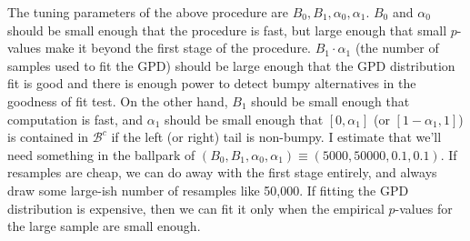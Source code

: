 \documentclass[12pt]{article}
\begin{document}
The tuning parameters of the above procedure are $B_0, B_1, \alpha_0, \alpha_1$. $B_0$ and $\alpha_0$ should be small enough that the procedure is fast, but large enough that small $p$-values make it beyond the first stage of the procedure. $B_1 \cdot \alpha_1$ (the number of samples used to fit the GPD) should be large enough that the GPD distribution fit is good and there is enough power to detect bumpy alternatives in the goodness of fit test. On the other hand, $B_1$ should be small enough that computation is fast, and $\alpha_1$ should be small enough that $[0,\alpha_1]$ (or $[1-\alpha_1, 1]$) is contained in $\mathcal B^c$ if the left (or right) tail is non-bumpy. I estimate that we'll need something in the ballpark of $(B_0, B_1, \alpha_0, \alpha_1) \equiv (5000, 50000, 0.1, 0.1)$. If resamples are cheap, we can do away with the first stage entirely, and always draw some large-ish number of resamples like 50,000. If fitting the GPD distribution is expensive, then we can fit it only when the empirical $p$-values for the large sample are small enough.
\end{document}
